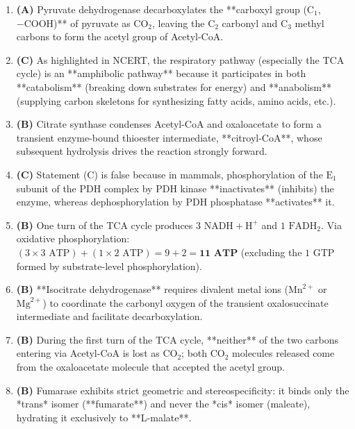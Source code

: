 \documentclass[11pt, a4paper]{article}
\begin{document}
\begin{enumerate}[label=\textbf{\arabic*.}]
\item \textbf{(A)} Pyruvate dehydrogenase decarboxylates the **carboxyl group ($\text{C}_1$, $-\text{COOH}$)** of pyruvate as $\text{CO}_2$, leaving the $\text{C}_2$ carbonyl and $\text{C}_3$ methyl carbons to form the acetyl group of Acetyl-CoA.

\item \textbf{(C)} As highlighted in NCERT, the respiratory pathway (especially the TCA cycle) is an **amphibolic pathway** because it participates in both **catabolism** (breaking down substrates for energy) and **anabolism** (supplying carbon skeletons for synthesizing fatty acids, amino acids, etc.).

\item \textbf{(B)} Citrate synthase condenses Acetyl-CoA and oxaloacetate to form a transient enzyme-bound thioester intermediate, **citroyl-CoA**, whose subsequent hydrolysis drives the reaction strongly forward.

\item \textbf{(C)} Statement (C) is false because in mammals, phosphorylation of the $\text{E}_1$ subunit of the PDH complex by PDH kinase **inactivates** (inhibits) the enzyme, whereas dephosphorylation by PDH phosphatase **activates** it.

\item \textbf{(B)} One turn of the TCA cycle produces $3\text{ NADH} + \text{H}^+$ and $1\text{ FADH}_2$. Via oxidative phosphorylation: $(3 \times 3\text{ ATP}) + (1 \times 2\text{ ATP}) = 9 + 2 = \mathbf{11\text{ ATP}}$ (excluding the $1\text{ GTP}$ formed by substrate-level phosphorylation).

\item \textbf{(B)} **Isocitrate dehydrogenase** requires divalent metal ions ($\text{Mn}^{2+}$ or $\text{Mg}^{2+}$) to coordinate the carbonyl oxygen of the transient oxalosuccinate intermediate and facilitate decarboxylation.

\item \textbf{(B)} During the first turn of the TCA cycle, **neither** of the two carbons entering via Acetyl-CoA is lost as $\text{CO}_2$; both $\text{CO}_2$ molecules released come from the oxaloacetate molecule that accepted the acetyl group.

\item \textbf{(B)} Fumarase exhibits strict geometric and stereospecificity: it binds only the *trans* isomer (**fumarate**) and never the *cis* isomer (maleate), hydrating it exclusively to **L-malate**.


\end{enumerate}
\end{document}
